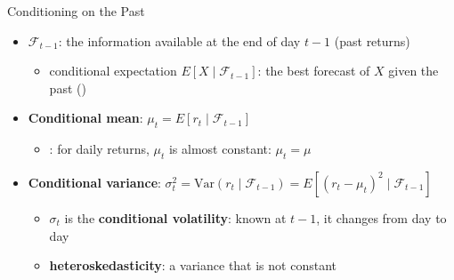 \begin{frame}{Conditioning on the Past}
\itemsize{\small}
\begin{itemize}
    \item $\mathcal{F}_{t-1}$: the information available at the end of day $t-1$ (past returns)
    \begin{itemize}
        \item conditional expectation $E[X \mid \mathcal{F}_{t-1}]$: the best forecast of $X$ given the past ()
    \end{itemize}
    \item \textbf{Conditional mean}: $\mu_t = E[r_t \mid \mathcal{F}_{t-1}]$
    \begin{itemize}
        \item {}: for daily returns, $\mu_t$ is almost constant: $\mu_t = \mu$
    \end{itemize}
    \item \textbf{Conditional variance}: $\sigma_t^2 = \mathrm{Var}(r_t \mid \mathcal{F}_{t-1}) = E[(r_t - \mu_t)^2 \mid \mathcal{F}_{t-1}]$
    \begin{itemize}
        \item $\sigma_t$ is the \textbf{conditional volatility}: known at $t-1$, it changes from day to day
        \item \textbf{heteroskedasticity}: a variance that is not constant
    \end{itemize}
\end{itemize}
\end{frame}

